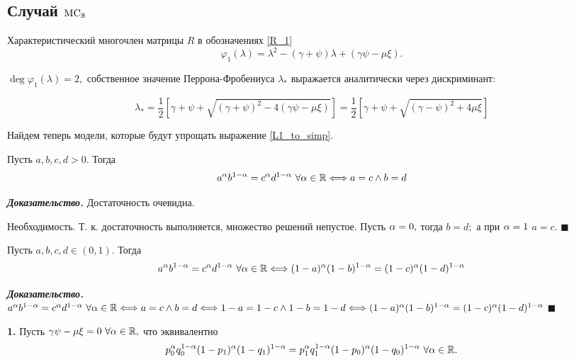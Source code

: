 \subsection{Случай $\mathrm{MC}_{\mathbb{B}}$}

Характеристический многочлен матрицы $R$ в обозначениях \eqref{R_1}
\begin{equation}
 \varphi_1(\lambda) = \lambda^2 - (\gamma + \psi)\lambda + (\gamma \psi - \mu \xi).
\end{equation}

$\deg \varphi_1(\lambda) = 2,$ собственное значение Перрона-Фробениуса $\lambda_\ast$ выражается аналитически через дискриминант:

\begin{equation}
\label{L1_to_simp}
\lambda_\ast = \frac{1}{2} \left[ \gamma + \psi + \sqrt{(\gamma + \psi)^2 - 4 (\gamma \psi - \mu \xi)} \right] = \frac{1}{2} \left[ \gamma + \psi + \sqrt{(\gamma - \psi)^2 + 4 \mu \xi} \right]
\end{equation}

Найдем теперь модели, которые будут упрощать выражение \eqref{L1_to_simp}.

\begin{lem}
\label{RESHEN_1}
Пусть $a, b, c, d > 0$. Тогда
$$a^\al b^\ea = c^\al d^\ea \ \forall \alpha \in \R \Longleftrightarrow a = c \wedge b = d$$
\end{lem}

{\bf\it Доказательство.} Достаточность очевидна. 

Необходимость. Т. к. достаточность выполняется, множество решений непустое. Пусть  $\alpha = 0,$ тогда $b = d;$ а при $\alpha = 1$ $a = c.$ $\blacksquare$

\begin{lem}
\label{RESHEN_2}
Пусть $a, b, c, d \in (0, 1)$. Тогда
$$a^\al b^\ea = c^\al d^\ea \ \forall \alpha \in \R \Longleftrightarrow (1 - a)^\al (1 - b)^\ea = (1 - c)^\al (1-d)^\ea$$
\end{lem}
{\bf\it Доказательство.} $a^\al b^\ea = c^\al d^\ea \ \forall \alpha \in \R \Longleftrightarrow a = c \wedge b = d \Longleftrightarrow 1 - a = 1 - c \wedge 1-b = 1- d \Longleftrightarrow (1 - a)^\al (1 - b)^\ea = (1 - c)^\al (1-d)^\ea$ $\blacksquare$

{\bf 1.} Пусть $\gamma \psi - \mu \xi = 0 \ \forall \alpha \in \R,$ что эквивалентно
\begin{equation}
\label{L1_1EQ}
p_0^\alpha q_0^{1-\alpha} (1 - p_1)^\alpha (1 - q_1)^{1 - \alpha} =  p_1^\alpha q_1^{1-\alpha} (1 - p_0)^\alpha (1 - q_0)^{1 - \alpha} \ \forall \alpha \in \R.
\end{equation} 

